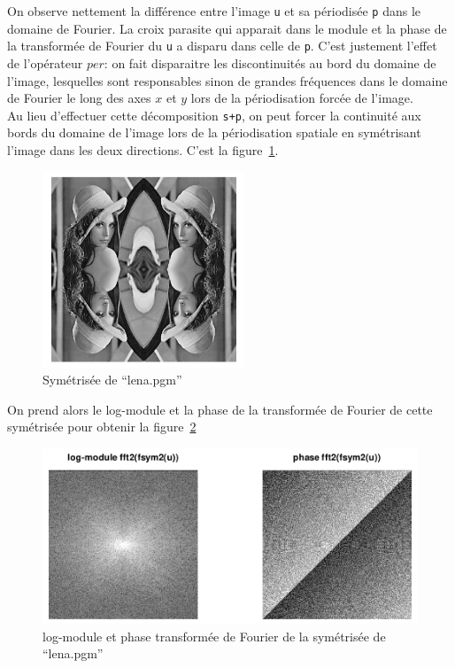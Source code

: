 \documentclass[a4paper, 11pt]{article}
\begin{document}
On observe nettement la différence entre l'image \texttt{u} et sa périodisée \texttt{p} dans le domaine de Fourier. La croix \og
parasite \fg qui apparait dans le module et la phase de la transformée de Fourier du \texttt{u} a disparu dans celle
de \texttt{p}. C'est justement l'effet de l'opérateur $per$: on fait disparaitre les discontinuités au bord du domaine
de l'image, lesquelles sont responsables sinon de grandes fréquences dans le domaine de Fourier le long des axes $x$ et
$y$ lors de la périodisation forcée de l'image. \\

Au lieu d'effectuer cette décomposition \texttt{s+p}, on peut forcer la continuité aux bords du domaine de l'image lors
de la périodisation spatiale en symétrisant l'image dans les deux directions. C'est la figure~\ref{fig:fsym}.

\begin{figure}[!h]
  \centering
  \includegraphics[width=6cm]{lena_fsym2.png}
  \caption{Symétrisée de “lena.pgm”}
  \label{fig:fsym}
\end{figure}

On prend alors le log-module et la phase de la transformée de Fourier de cette symétrisée pour obtenir la
figure~\ref{fig:ffsym}

\begin{figure}[!h]
  \centering
  \includegraphics[width=14cm]{lena_fft_fsym2u.png}
  \caption{log-module et phase transformée de Fourier de la symétrisée de “lena.pgm”}
  \label{fig:ffsym}
\end{figure}
\end{document}
